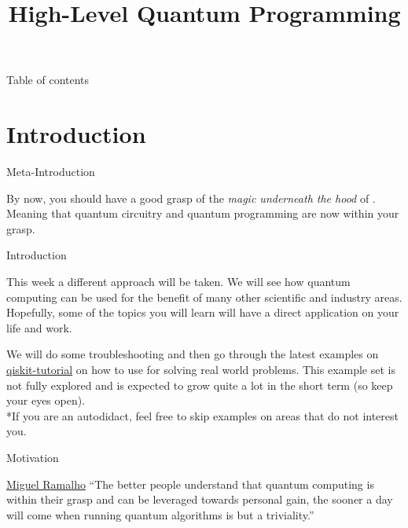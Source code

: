 \documentclass[aspectratio=43]{beamer}
\title{High-Level Quantum Programming}
\begin{document}
\begin{frame}
	\titlepage
\end{frame}


\begin{frame}{Table of contents}
	\begin{card}
		\tableofcontents
	\end{card}
\end{frame}


\section{Introduction}
\begin{frame}{Meta-Introduction}
    \begin{card}
        By now, you should have a good grasp of the \textit{magic underneath the hood} of \qc. Meaning that quantum circuitry and quantum programming are now within your grasp.
    \end{card}
\pagenumber
\end{frame}

\begin{frame}{Introduction}
    \begin{cardTiny}
        This week a different approach will be taken. We will see how quantum computing can be used for the benefit of many other scientific and industry areas. Hopefully, some of the topics you will learn will have a direct application on your life and work. 
    \end{cardTiny}
    \begin{cardTiny}
        We will do some \qka troubleshooting and then go through the latest examples on \href{https://github.com/Qiskit/qiskit-tutorial}{qiskit-tutorial} on how to use \qsa for solving real world problems. This example set is not fully explored and is expected to grow quite a lot in the short term (so keep your eyes open).\\
        \small{*If you are an autodidact, feel free to skip examples on areas that do not interest you.}
    \end{cardTiny}
\pagenumber
\end{frame}

\begin{frame}{Motivation}
    \begin{card}
    \begin{chapquote}[2pt]{\href{https://msramalho.github.io/}{Miguel Ramalho}}
        ``The better people understand that quantum computing is within their grasp and can be leveraged towards personal gain, the sooner a day will come when running quantum algorithms is but a triviality.''
    \end{chapquote}
    \end{card}
\pagenumber
\end{frame}
\end{document}
